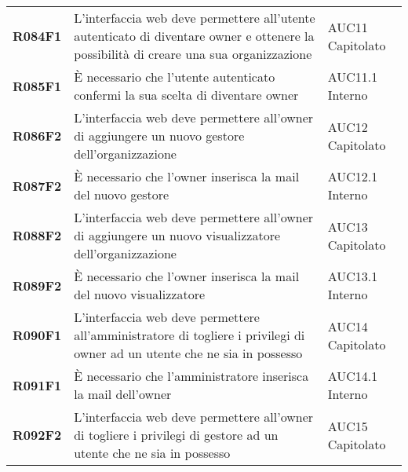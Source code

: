 \documentclass[../analisi-dei-requisiti.tex]{subfiles}
\begin{document}
\begin{longtable}[H]{>{\centering\bfseries}m{3cm} >{\centering}m{10cm} >{\centering\arraybackslash}m{3cm}}
  R084F1                               & L'interfaccia web deve permettere all'utente autenticato di diventare owner e ottenere la possibilità di creare una sua organizzazione                                                                  & AUC11 Capitolato              \\
  R085F1                               & È necessario che l'utente autenticato confermi la sua scelta di diventare owner                                                                                                                         & AUC11.1 Interno               \\
  R086F2                               & L'interfaccia web deve permettere all'owner di aggiungere un nuovo gestore dell'organizzazione                                                                                                          & AUC12 Capitolato              \\
  R087F2                               & È necessario che l'owner inserisca la mail del nuovo gestore                                                                                                                                            & AUC12.1 Interno               \\
  R088F2                               & L'interfaccia web deve permettere all'owner di aggiungere un nuovo visualizzatore dell'organizzazione                                                                                                   & AUC13 Capitolato              \\
  R089F2                               & È necessario che l'owner inserisca la mail del nuovo visualizzatore                                                                                                                                     & AUC13.1 Interno               \\
  R090F1                               & L'interfaccia web deve permettere all'amministratore di togliere i privilegi di owner ad un utente che ne sia in possesso                                                                               & AUC14 Capitolato              \\
  R091F1                               & È necessario che l'amministratore inserisca la mail dell'owner                                                                                                                                          & AUC14.1 Interno               \\
  R092F2                               & L'interfaccia web deve permettere all'owner di togliere i privilegi di gestore ad un utente che ne sia in possesso                                                                                      & AUC15 Capitolato              \\

\end{longtable}
\end{document}
